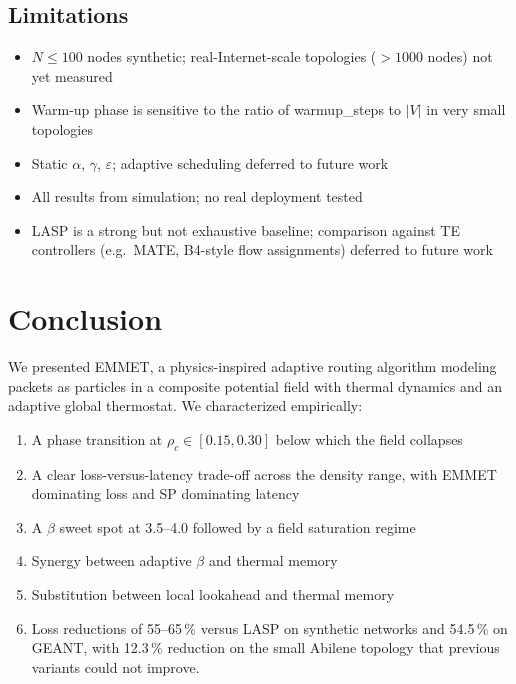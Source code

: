 \documentclass[11pt,a4paper]{article}
\begin{document}
\subsection{Limitations}\label{sec:limits}

\begin{itemize}[itemsep=1pt]
  \item $N \leq 100$ nodes synthetic; real-Internet-scale topologies
        ($> 1000$ nodes) not yet measured
  \item Warm-up phase is sensitive to the ratio of warmup\_steps to
        $|V|$ in very small topologies
  \item Static $\alpha$, $\gamma$, $\varepsilon$; adaptive scheduling
        deferred to future work
  \item All results from simulation; no real deployment tested
  \item LASP is a strong but not exhaustive baseline; comparison
        against TE controllers (e.g.\ MATE, B4-style flow assignments)
        deferred to future work
\end{itemize}

\section{Conclusion}

We presented EMMET, a physics-inspired adaptive routing algorithm
modeling packets as particles in a composite potential field with
thermal dynamics and an adaptive global thermostat. We characterized
empirically:
\begin{enumerate}[itemsep=2pt]
  \item A phase transition at $\rho_c \in [0.15, 0.30]$ below which
        the field collapses
  \item A clear loss-versus-latency trade-off across the density range, with EMMET dominating loss and SP dominating latency
  \item A $\beta$ sweet spot at 3.5--4.0 followed by a field
        saturation regime
  \item Synergy between adaptive $\beta$ and thermal memory
  \item Substitution between local lookahead and thermal memory
  \item Loss reductions of 55--65\,\% versus LASP on synthetic
        networks and 54.5\,\% on GEANT, with 12.3\,\% reduction on
        the small Abilene topology that previous variants could not
        improve.
\end{enumerate}
\end{document}
